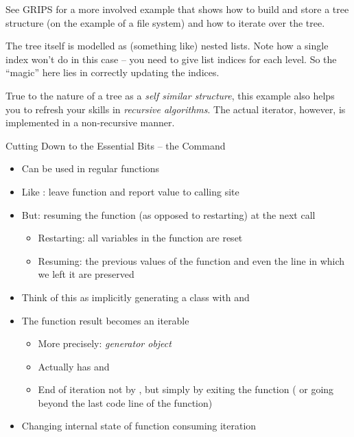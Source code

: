 \begin{frame}
%
\begin{hintbox}
See GRIPS for a more involved example that shows how to build and store a tree structure (on the example of a file system) and how to iterate over the tree.

\vspace{6pt}
The tree itself is modelled as (something like) nested lists. Note how a single index won't do in this case -- you need to give list indices for each level. So the \enquote{magic} here lies in correctly updating the indices.

\vspace{6pt}
True to the nature of a tree as a \emph{self similar structure}, this example also helps you to refresh your skills in \emph{recursive algorithms}.
The actual iterator, however, is implemented in a non-recursive manner.
\end{hintbox}
%
\end{frame}


\begin{frame}[fragile]{Cutting Down to the Essential Bits -- the Command }
%
\begin{itemize}
\item Can be used in regular functions
\item Like : leave function and report value to calling site
\item But: resuming the function (as opposed to restarting) at the next call
	\begin{itemize}
	\item Restarting: all variables in the function are reset
	\item Resuming: the previous values of the function and even the line in which we left it are preserved
	\end{itemize}
\item Think of this as implicitly generating a class with  and 
\item The function result becomes an iterable
	\begin{itemize}
	\item More precisely: \emph{generator object}
	\item Actually has  and 
	\item End of iteration not by , but simply by exiting the function ( or going beyond the last code line of the function)
	\end{itemize}
\item Changing internal state of function \Thus consuming iteration
\end{itemize}
%
\end{frame}

